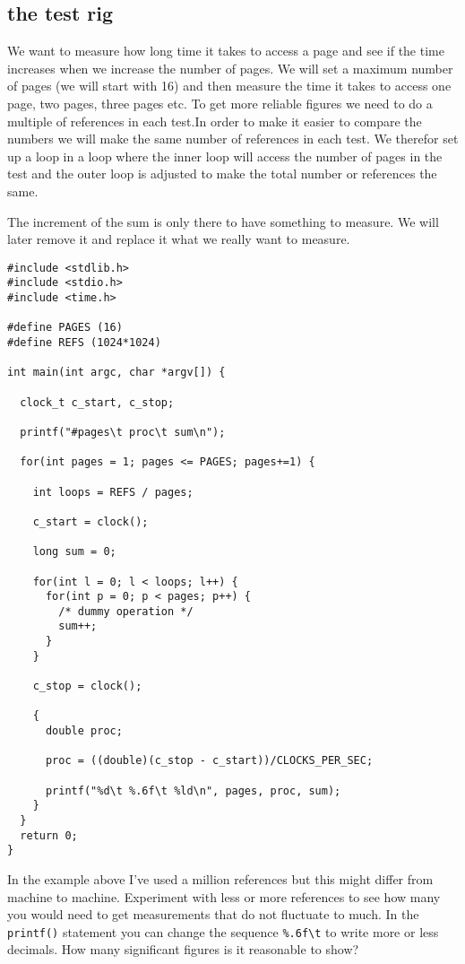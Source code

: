 \documentclass[a4paper,11pt]{article}
\begin{document}
\subsection{the test rig}

We want to measure how long time it takes to access a page and see if
the time increases when we increase the number of pages. We will set a
maximum number of pages (we will start with 16) and then measure the
time it takes to access one page, two pages, three pages etc. To get
more reliable figures we need to do a multiple of references in each
test.In order to make it easier to compare the numbers we will make
the same number of references in each test. We therefor set up a loop
in a loop where the inner loop will access the number of pages in the
test and the outer loop is adjusted to make the total number or
references the same.

The increment of the sum is only there to have something to
measure. We will later remove it and replace it what we really want to
measure.

\begin{lstlisting}
#include <stdlib.h>
#include <stdio.h>
#include <time.h>

#define PAGES (16)
#define REFS (1024*1024)

int main(int argc, char *argv[]) {

  clock_t c_start, c_stop;

  printf("#pages\t proc\t sum\n");  

  for(int pages = 1; pages <= PAGES; pages+=1) {

    int loops = REFS / pages;

    c_start = clock();

    long sum = 0;

    for(int l = 0; l < loops; l++) {
      for(int p = 0; p < pages; p++) {
        /* dummy operation */
        sum++;
      }
    }

    c_stop = clock();

    {
      double proc;

      proc = ((double)(c_stop - c_start))/CLOCKS_PER_SEC;

      printf("%d\t %.6f\t %ld\n", pages, proc, sum);
    }
  }
  return 0;
}
\end{lstlisting}

In the example above I've used a million references but this might
differ from machine to machine. Experiment with less or more
references to see how many you would need to get measurements that do
not fluctuate to much. In the {\tt printf()} statement you can change the
sequence {\tt \%.6f\textbackslash t} to write more or less decimals. How many
significant figures is it reasonable to show?
\end{document}

